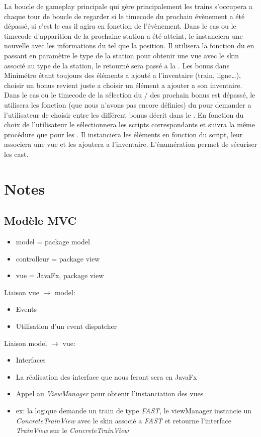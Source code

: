 \documentclass[report, backcover, french, nodocumentinfo]{upmethodology-document}
\begin{document}
				La boucle de gameplay principale qui gère principalement les trains s'occupera a chaque tour de boucle de regarder si le timecode du prochain évènement a été dépassé, si c'est le cas il agira en fonction de l'évènement.
				Dans le cas ou le timecode d'apparition de la prochaine station a été atteint, le  instanciera une nouvelle  avec les informations du  tel que la position. Il utilisera la fonction  du  en passant en paramètre le type de la station pour obtenir une vue avec le skin associé au type de la station, le  retourné sera passé a la .
				Les bonus dans Minimétro étant toujours des éléments a ajouté a l'inventaire (train, ligne\ldots), choisir un bonus revient juste a choisir un élément a ajouter a son inventaire. Dans le cas ou le timecode de la sélection du / des prochain bonus est dépassé, le  utilisera les fonction (que nous n'avons pas encore définies) du  pour demander a l'utilisateur de choisir entre les différent bonus décrit dans le . En fonction du choix de l'utilisateur le  sélectionnera les scripts correspondants et suivra la même procédure que pour les . Il instanciera les éléments en fonction du script, leur associera une vue et les ajoutera a l'inventaire. L'énumération  permet de sécuriser les cast.
	\chapter{Notes}
		\section{Modèle MVC}
			\begin{itemize}
				\item model = package model
				\item controlleur = package view
				\item vue = JavaFx, package view
			\end{itemize}
			Liaison vue $\rightarrow$ model:
			\begin{itemize}
				\item Events
				\item Utilisation d'un event dispatcher
			\end{itemize}
			Liaison model $\rightarrow$ vue:
			\begin{itemize}
				\item Interfaces
				\item La réalisation des interface que nous feront sera en JavaFx
				\item Appel au \textit{ViewManager} pour obtenir l'instanciation des vues
				\item ex: la logique demande un train de type \textit{FAST}, le viewManager instancie un \textit{ConcreteTrainView} avec le skin associé a \textit{FAST} et retourne l'interface \textit{TrainView} sur le \textit{ConcreteTrainView}
			\end{itemize}
\end{document}
